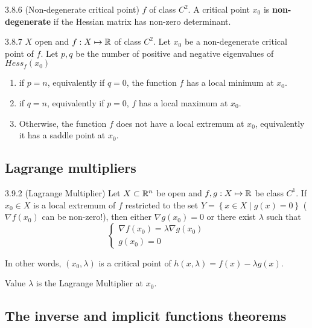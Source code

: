 \begin{definition}{3.8.6 (Non-degenerate critical point)}
    $f$ of class $C^2$. A critical point $x_0$ is \textbf{non-degenerate} if the Hessian matrix has non-zero determinant.
\end{definition}

\begin{corollary}{3.8.7}
    $X$ open and $f: X \mapsto \mathbb{R}$ of class $C^2$. Let $x_0$ be a non-degenerate critical point of $f$. Let $p, q$ be the number of positive and negative eigenvalues of $Hess_f (x_0)$
    \begin{enumerate}
        \item if $p = n$, equivalently if $q = 0$, the function $f$ has a local minimum at $x_0$.
        \item if $q = n$, equivalently if $p = 0$, $f$ has a local maximum at $x_0$.
        \item Otherwise, the function $f$ does not have a local extremum at $x_0$, equivalently it has a saddle point at $x_0$.
    \end{enumerate}
\end{corollary}

\subsection{Lagrange multipliers}

\begin{proposition}{3.9.2 (Lagrange Multiplier)}
    Let $X \subset \mathbb{R}^n$ be open and $f,g: X \mapsto \mathbb{R}$ be class $C^1$.
    If $x_0 \in X$ is a local extremum of $f$ restricted to the set
    $Y = \left\{ x \in X \mid g(x) = 0 \right\}$ ($\nabla f(x_0)$ can be non-zero!),
    then either $\nabla g(x_0) = 0$ or there exist $\lambda$ such that
    \[ \begin{cases}
            \nabla f(x_0) = \lambda \nabla g(x_0) \\
            g(x_0) = 0
        \end{cases} \]

    In other words, $(x_0, \lambda)$ is a critical point of $h(x, \lambda) = f(x) - \lambda g(x)$.

    Value $\lambda$ is the Lagrange Multiplier at $x_0$.
\end{proposition}

\subsection{The inverse and implicit functions theorems}

